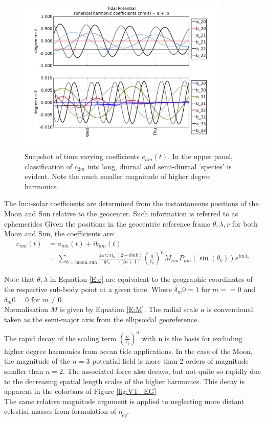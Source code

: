 \begin{figure}[h]
\begin{center}
\includegraphics[width=100mm]{figures/tidal_coeff_timeseries_2days.png}
\caption{Snapshot of time varying coefficients $c_{nm}(t)$.  In the upper panel, classification of $c_{2m}$ into long, diurnal and semi-diurnal `species' is evident.  Note the much smaller magnitude of higher degree harmonics.}
\end{center}
\end{figure}

The luni-solar coefficients are determined from the instantaneous positions of the Moon and Sun relative to the geocenter.  Such information is referred to as ephemerides \citep[Section 8.1]{Urban:2013vl}
Given the positions in the geocentric reference frame $\theta,\lambda,r$ for both Moon and Sun, the coefficients are:
\begin{align}
\label{E:c}
c_{nm}(t) &= a_{nm}(t) + ib_{nm}(t) \nonumber \\
          &= \sum_{b=\text{moon},\text{sun}}    \frac{4 \pi GM_{b}}{g r_{b}}  \frac{(2-\delta{m0})} {(2n+1)} \left(\frac{a}{r_b} \right)^n    M_{nm} P_{nm}( \sin(\theta_b) ) e^{im\lambda_b}
\end{align}

Note that $\theta,\lambda$ in Equation \ref{E:c} are equivalent to the geographic coordinates of the respective sub-body point at a given time. 
Where $\delta_m0 = 1$ for $m==0$ and $\delta_m0 = 0$ for $m \neq 0$.\\
Normalisation $M$ is given by Equation \ref{E:M}. The radial scale $a$ is conventional taken as the semi-major axis from the ellipsoidal georeference. 



The rapid decay of the scaling term $\left(\frac{a}{r_b} \right)^n$ with n is the basis for excluding higher degree harmonics from ocean tide applications.  In the case of the Moon, the magnitude of the $n=3$ potential field is more than 2 orders of magnitude smaller than $n=2$.  The associated force also decays, but not quite so rapidly due to the decreasing spatial length scales of the higher harmonics.  This decay is apparent in the colorbars of Figure \ref{fig:VT_EG}\\
The same relative magnitude argument is applied to neglecting more distant celestial masses from formulation of $\eta_{eq}$.



